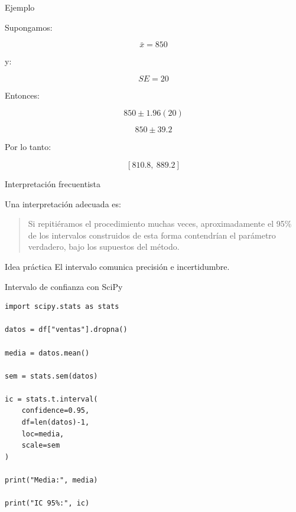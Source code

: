 \documentclass[aspectratio=169,11pt]{beamer}
\begin{document}

\begin{frame}{Ejemplo}

Supongamos:

\[
\bar{x}
=
850
\]

y:

\[
SE
=
20
\]

Entonces:

\[
850
\pm
1.96(20)
\]

\[
850
\pm
39.2
\]

Por lo tanto:

\[
[810.8,\ 889.2]
\]

\end{frame}


\begin{frame}{Interpretación frecuentista}

Una interpretación adecuada es:

\begin{quote}

Si repitiéramos el procedimiento muchas veces,
aproximadamente el 95\% de los intervalos construidos de esta forma
contendrían el parámetro verdadero,
bajo los supuestos del método.

\end{quote}

\vspace{0.4cm}

\begin{block}{Idea práctica}
El intervalo comunica precisión e incertidumbre.
\end{block}

\end{frame}


\begin{frame}[fragile]{Intervalo de confianza con SciPy}

\begin{lstlisting}
import scipy.stats as stats

datos = df["ventas"].dropna()

media = datos.mean()

sem = stats.sem(datos)

ic = stats.t.interval(
    confidence=0.95,
    df=len(datos)-1,
    loc=media,
    scale=sem
)

print("Media:", media)

print("IC 95%:", ic)
\end{lstlisting}

\end{frame}
\end{document}
